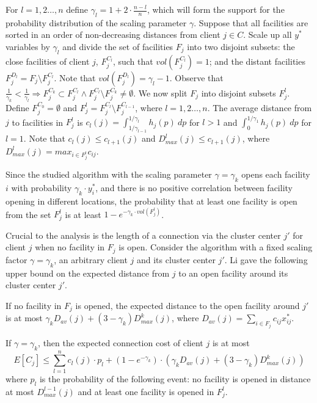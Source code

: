 \documentclass{llncs}
\begin{document}
 For $l = 1, 2 \dots, n$ define $\gamma_l = 1 + 2 \cdot \frac{n - l}{n}$, which will form the support for the probability distribution of the scaling parameter $\gamma$. Suppose that all facilities are sorted in an order of non-decreasing distances from client $j \in C$. Scale up all $y^*$ variables by $\gamma_l$ and divide the set of facilities $F_j$ into two disjoint subsets: the close facilities of client $j$, $F_j^{C_l}$, such that $vol(F_j^{C_l}) = 1$; and the distant facilities $F_j^{D_l} = F_j \setminus F_j^{C_l}$. Note that $vol(F_j^{D_l}) = \gamma_l - 1$.
Observe that$\frac{1}{\gamma_k} < \frac{1}{\gamma_l} \Rightarrow F_j^{C_k} \subset F_j^{C_l} \wedge F_j^{C_l} \setminus F_j^{C_k} \neq \emptyset$. We now split $F_j$ into disjoint subsets $F_j^l$. Define $F_j^{C_0} = \emptyset$ and $F_j^l = F_j^{C_l} \setminus F_j^{C_{l-1}}$, where $l = 1, 2 \dots, n$. The average distance from $j$ to facilities in $F_j^l$ is $c_l(j) = \int_{1/\gamma_{l-1}}^{1/\gamma_{l}} h_j(p)~dp$ for $l > 1$ and $\int_{0}^{1/\gamma_{1}} h_j(p)~dp$ for $l = 1$. Note that $c_{l}(j) \leq c_{l+1}(j)$ and $D_{max}^{l}(j) \leq c_{l+1}(j)$, where $D_{max}^{l}(j) = max_{i \in F_j^l}{c_{ij}}$.

Since the studied algorithm with the scaling parameter $\gamma = \gamma_k$ opens each facility $i$ with probability $\gamma_k \cdot y_i^*$,
and there is no positive correlation between facility opening in different locations,
the probability that at least one facility is open from the set $F_j^l$ is at least $1 - e^{-\gamma_k \cdot vol(F_j^l)}$.

Crucial to the analysis is the length of a connection via the cluster center $j'$ for client $j$ when no facility in $F_j$ is open.
Consider the algorithm with a fixed scaling factor $\gamma=\gamma_k$, an arbitrary client $j$ and its cluster center $j'$.
Li gave the following upper bound on the expected distance from $j$ to an open facility around its cluster center $j'$.
 \begin{lemma} 
 \label{cluster_close_distance}
  If no facility in $F_j$ is opened, the expected distance to the open facility around $j'$ is at most $\gamma_k D_{av}(j) + (3 - \gamma_k)D_{max}^k(j)$,
  where $ D_{av}(j) = \sum_{i \in F_j} c_{ij}x_{ij}^*$.
 \end{lemma}

 \begin{corollary}
 \label{upperbound_for_c}
  If $\gamma=\gamma_k$, then the expected connection cost of client $j$ is at most
  $$E[C_j] \leq \sum_{l = 1}^{n} c_l(j) \cdot p_l + (1 - e^{-\gamma_k}) \cdot (\gamma_k D_{av}(j) + (3 - \gamma_k)D_{max}^k (j))$$ where $p_l$ is the probability of the following event: no facility is opened in distance at most $D_{max}^{l-1}(j)$ and at least one facility is opened in $F_j^l$.
 \end{corollary}
\end{document}
